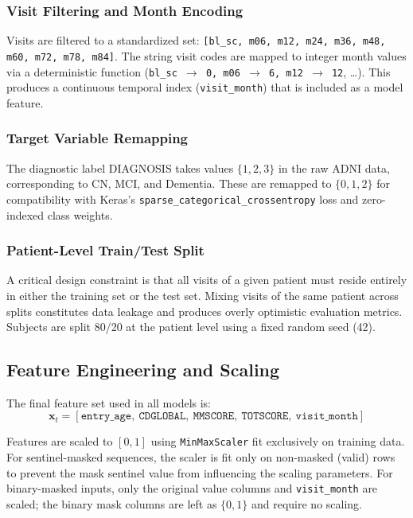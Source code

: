 \documentclass[12pt,singleside,a4paper]{article}
\begin{document}
\subsubsection{Visit Filtering and Month Encoding}
Visits are filtered to a standardized set: \texttt{[bl\_sc, m06, m12, m24, m36, m48, m60, m72, m78, m84]}. The string visit codes are mapped to integer month values via a deterministic function (\texttt{bl\_sc $\to$ 0, m06 $\to$ 6, m12 $\to$ 12}, \ldots). This produces a continuous temporal index (\texttt{visit\_month}) that is included as a model feature.

\subsubsection{Target Variable Remapping}
The diagnostic label DIAGNOSIS takes values $\{1, 2, 3\}$ in the raw ADNI data, corresponding to CN, MCI, and Dementia. These are remapped to $\{0, 1, 2\}$ for compatibility with Keras's \texttt{sparse\_categorical\_crossentropy} loss and zero-indexed class weights.

\subsubsection{Patient-Level Train/Test Split}
A critical design constraint is that all visits of a given patient must reside entirely in either the training set or the test set. Mixing visits of the same patient across splits constitutes data leakage and produces overly optimistic evaluation metrics. Subjects are split 80/20 at the patient level using a fixed random seed (42).

\subsection{Feature Engineering and Scaling}

The final feature set used in all models is:
\[
\mathbf{x}_t = [\texttt{entry\_age},\ \texttt{CDGLOBAL},\ \texttt{MMSCORE},\ \texttt{TOTSCORE},\ \texttt{visit\_month}]
\]

Features are scaled to $[0,1]$ using \texttt{MinMaxScaler} fit exclusively on training data. For sentinel-masked sequences, the scaler is fit only on non-masked (valid) rows to prevent the mask sentinel value from influencing the scaling parameters. For binary-masked inputs, only the original value columns and \texttt{visit\_month} are scaled; the binary mask columns are left as $\{0, 1\}$ and require no scaling.
\end{document}
